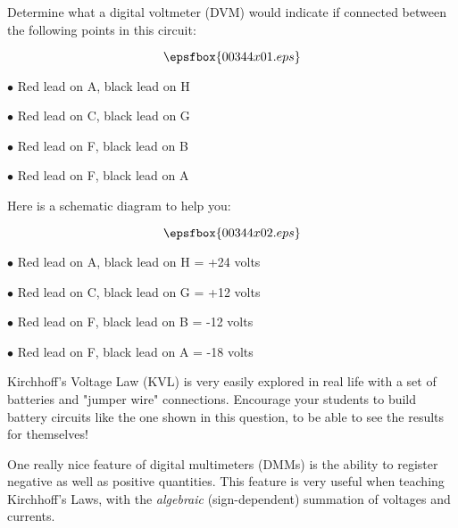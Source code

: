 

Determine what a digital voltmeter (DVM) would indicate if connected between the following points in this circuit:

$$\epsfbox{00344x01.eps}$$

\medskip
\item{$\bullet$} Red lead on A, black lead on H
\item{$\bullet$} Red lead on C, black lead on G
\item{$\bullet$} Red lead on F, black lead on B
\item{$\bullet$} Red lead on F, black lead on A 
\medskip







Here is a schematic diagram to help you:

$$\epsfbox{00344x02.eps}$$

\medskip
\item{$\bullet$} Red lead on A, black lead on H = +24 volts
\item{$\bullet$} Red lead on C, black lead on G = +12 volts
\item{$\bullet$} Red lead on F, black lead on B = -12 volts
\item{$\bullet$} Red lead on F, black lead on A = -18 volts
\medskip







Kirchhoff's Voltage Law (KVL) is very easily explored in real life with a set of batteries and "jumper wire" connections.  Encourage your students to build battery circuits like the one shown in this question, to be able to see the results for themselves!

One really nice feature of digital multimeters (DMMs) is the ability to register negative as well as positive quantities.  This feature is very useful when teaching Kirchhoff's Laws, with the {\it algebraic} (sign-dependent) summation of voltages and currents.




